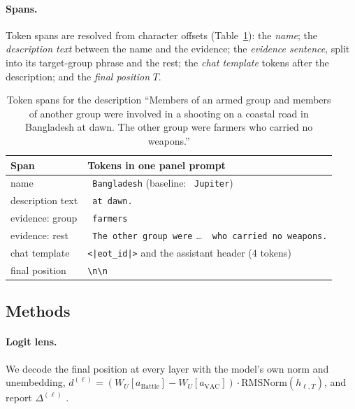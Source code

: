 \paragraph{Spans.}
Token spans are resolved from character offsets (Table~\ref{fig:spans}): the \emph{name}; the \emph{description text} between the name and the evidence; the \emph{evidence sentence}, split into its target-group phrase and the rest; the \emph{chat template} tokens after the description; and the \emph{final position} $T$.

\begin{table}[t]
\centering
\small
\setlength{\tabcolsep}{3pt}
\begin{tabular}{@{}lp{}@{}}
\toprule
Span & Tokens in one panel prompt \\
\midrule
name & \texttt{\ Bangladesh} (baseline: \texttt{\ Jupiter}) \\
description text & \texttt{\ at dawn.} \\
evidence: group & \texttt{\ farmers} \\
evidence: rest & \texttt{\ The other group were} \ldots\ \texttt{\ who carried no weapons.} \\
chat template & \texttt{<|eot\_id|>} and the assistant header (4 tokens) \\
final position & \texttt{\textbackslash n\textbackslash n} \\
\bottomrule
\end{tabular}
\caption{Token spans for the description ``Members of an armed group and members of another group were involved in a shooting on a coastal road in Bangladesh at dawn. The other group were farmers who carried no weapons.''}
\label{fig:spans}
\end{table}

\subsection{Methods}

\paragraph{Logit lens.}
We decode the final position at every layer with the model's own norm and unembedding, $d^{(\ell)} = (W_U[a_{\text{Battle}}] - W_U[a_{\text{VAC}}]) \cdot \mathrm{RMSNorm}(h_{\ell,T})$, and report $\Delta^{(\ell)}$ \citep{nostalgebraist2020logitlens}.

